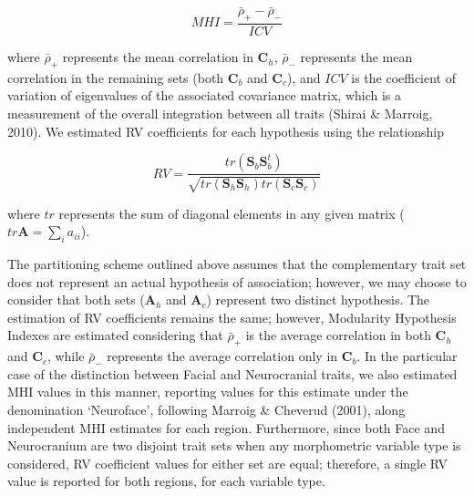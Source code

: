 \documentclass[12pt,twoside]{report}
\begin{document}
\begin{equation}
MHI = \frac {\bar{\rho}_{+} - \bar{\rho}_{-}} {ICV}
\label{eq:mi}
\end{equation}

where $\bar{\rho}_{+}$ represents the mean correlation in
$\mathbf{C}_h$, $\bar{\rho}_{-}$ represents the mean correlation in the
remaining sets (both $\mathbf{C}_b$ and $\mathbf{C}_c$), and $ICV$ is
the coefficient of variation of eigenvalues of the associated covariance
matrix, which is a measurement of the overall integration between all
traits (Shirai \& Marroig, 2010). We estimated RV coefficients for each
hypothesis using the relationship

\begin{equation}
RV = \frac{tr(\mathbf{S}_{b}\mathbf{S}^t_{b})}{\sqrt{tr(\mathbf{S}_h \mathbf{S}_h)tr(\mathbf{S}_c \mathbf{S}_c)}}
\label{eq:rv}
\end{equation}

where $tr$ represents the sum of diagonal elements in any given matrix
($tr \mathbf{A} = \sum_i a_{ii}$).

The partitioning scheme outlined above assumes that the complementary
trait set does not represent an actual hypothesis of association;
however, we may choose to consider that both sets ($\mathbf{A}_h$ and
$\mathbf{A}_c$) represent two distinct hypothesis. The estimation of RV
coefficients remains the same; however, Modularity Hypothesis Indexes
are estimated considering that $\bar{\rho}_{+}$ is the average
correlation in both $\mathbf{C}_h$ and $\mathbf{C}_c$, while
$\bar{\rho}_{-}$ represents the average correlation only in
$\mathbf{C}_b$. In the particular case of the distinction between Facial
and Neurocranial traits, we also estimated MHI values in this manner,
reporting values for this estimate under the denomination `Neuroface',
following Marroig \& Cheverud (2001), along independent MHI estimates
for each region. Furthermore, since both Face and Neurocranium are two
disjoint trait sets when any morphometric variable type is considered,
RV coefficient values for either set are equal; therefore, a single RV
value is reported for both regions, for each variable type.
\end{document}
